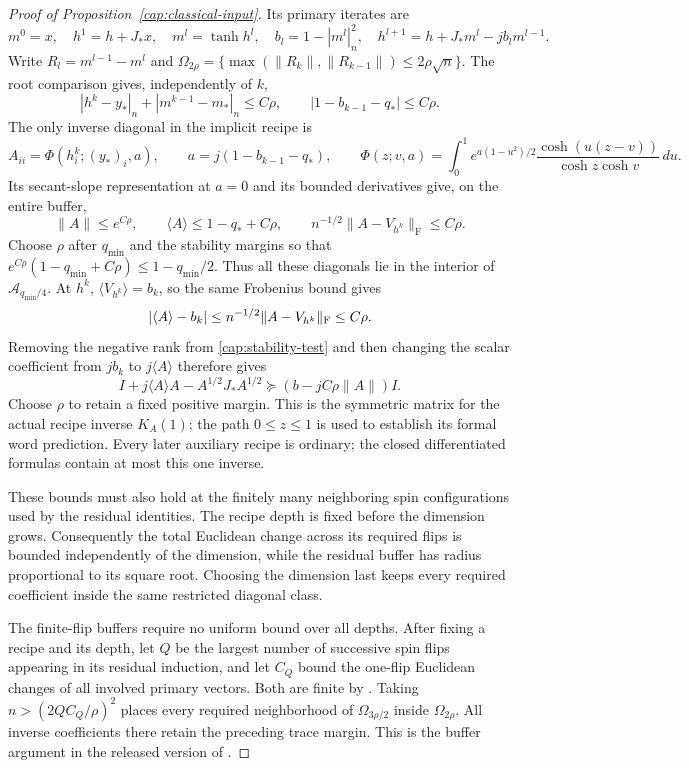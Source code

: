 \begin{proof}[Proof of Proposition~\ref{cap:classical-input}]
Its primary iterates are
\[
 m^0=x,\quad h^1=h+J_*x,\quad m^l=\tanh h^l,\quad
 b_l=1-|m^l|_n^2,\quad
 h^{l+1}=h+J_*m^l-jb_lm^{l-1}.
\]
Write $R_l=m^{l-1}-m^l$ and
$\Omega_{2\rho}=\{\max(\|R_k\|,\|R_{k-1}\|)\le2\rho\sqrt n\}$.
The root comparison gives, independently of $k$,
\[
 |h^k-y_*|_n+|m^{k-1}-m_*|_n\le C\rho,
 \qquad |1-b_{k-1}-q_*|\le C\rho.
\]
The only inverse diagonal in the implicit recipe is
\[
 A_{ii}=\Phi(h_i^k;(y_*)_i,a),\qquad
 a=j(1-b_{k-1}-q_*),\qquad
 \Phi(z;v,a)=\int_0^1 e^{a(1-u^2)/2}
              \frac{\cosh(u(z-v))}{\cosh z\cosh v}\,du.
\]
Its secant-slope representation at $a=0$ and its bounded derivatives
give, on the entire buffer,
\[
 \|A\|\le e^{C\rho},\qquad
 \langle A\rangle\le1-q_*+C\rho,
 \qquad n^{-1/2}\|A-V_{h^k}\|_{\mathrm F}\le C\rho.
\]
Choose $\rho$ after $q_{\min}$ and the stability margins so that
$e^{C\rho}(1-q_{\min}+C\rho)\le1-q_{\min}/2$. Thus all these diagonals lie in
the interior of \(\mathcal A_{q_{\min}/4}\). At \(h^k\),
\(\langle V_{h^k}\rangle=b_k\), so the same Frobenius bound gives
\[
 |\langle A\rangle-b_k|
 \le n^{-1/2}\|A-V_{h^k}\|_{\rm F}\le C\rho.
\]
Removing the negative rank from \eqref{cap:stability-test} and then changing
the scalar coefficient from \(jb_k\) to \(j\langle A\rangle\) therefore gives
\[
 I+j\langle A\rangle A-A^{1/2}J_*A^{1/2}
 \succeq (b-jC\rho\|A\|)I .
\]
Choose \(\rho\) to retain a fixed positive margin. This is the symmetric
matrix for the actual recipe inverse \(K_A(1)\); the path \(0\le z\le1\)
is used to establish its formal word prediction.
Every later auxiliary recipe is ordinary; the closed differentiated formulas
contain at most this one inverse.

These bounds must also hold at the finitely many neighboring spin
configurations used by the residual identities. The recipe depth is fixed
before the dimension grows. Consequently the total Euclidean change across its
required flips is bounded independently of the dimension, while the residual
buffer has radius proportional to its square root. Choosing the dimension last
keeps every required coefficient inside the same restricted diagonal class.

The finite-flip buffers require no uniform bound over all depths. After fixing
a recipe and its depth, let $Q$ be the largest number of successive spin flips
appearing in its residual induction, and let $C_Q$ bound the one-flip
Euclidean changes of all involved primary vectors. Both are finite by
\cite[Lemma~6.1]{AcceptedGap}. Taking $n>(2QC_Q/\rho)^2$ places every required
neighborhood of $\Omega_{3\rho/2}$ inside $\Omega_{2\rho}$. All inverse
coefficients there retain the preceding trace margin. This is the buffer
argument in the released version of \cite[Section~6.3]{AcceptedGap}.


\end{proof}
